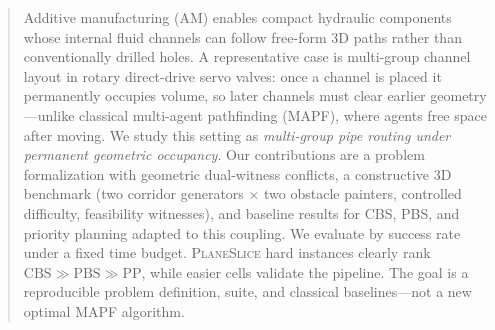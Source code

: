 
\begin{abstract}
Additive manufacturing (AM) enables compact hydraulic components whose internal
fluid channels can follow free-form 3D paths rather than conventionally drilled
holes. A representative case is multi-group channel layout in rotary
direct-drive servo valves: once a channel is placed it permanently occupies
volume, so later channels must clear earlier geometry---unlike classical
multi-agent pathfinding (MAPF), where agents free space after moving.
We study this setting as \emph{multi-group pipe routing under permanent
geometric occupancy}. Our contributions are a problem formalization with
geometric dual-witness conflicts, a constructive 3D benchmark (two corridor
generators $\times$ two obstacle painters, controlled difficulty, feasibility
witnesses), and baseline results for CBS, PBS, and priority planning adapted to
this coupling. We evaluate by success rate under a fixed time budget.
\textsc{PlaneSlice} hard instances clearly rank
$\mathrm{CBS}\gg\mathrm{PBS}\gg\mathrm{PP}$, while easier cells validate the
pipeline. The goal is a reproducible problem definition, suite, and classical
baselines---not a new optimal MAPF algorithm.
\end{abstract}
